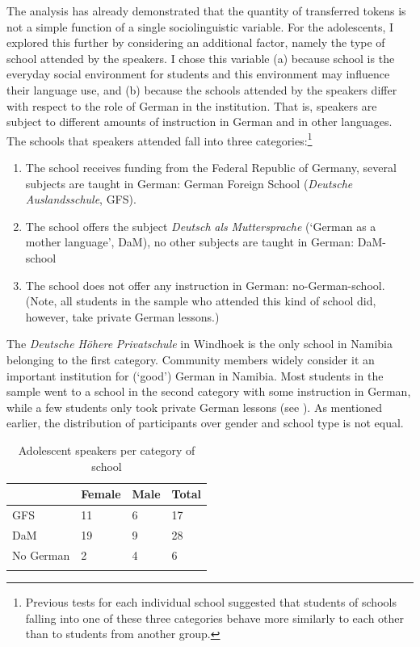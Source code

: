 \documentclass[output=paper]{langsci/langscibook}
\begin{document}
The analysis has already demonstrated that the quantity of transferred tokens is not a simple function of a single sociolinguistic variable.  For the adolescents, I explored this further by considering an additional factor, namely the type of school attended by the speakers. I chose this variable (a) because school is the everyday social environment for students and this environment may influence their language use, and (b) because the schools attended by the speakers differ with respect to the role of German in the institution. That is, speakers are subject to different amounts of instruction in German and in other languages. The schools that speakers attended fall into three categories:\footnote{Previous tests for each individual school suggested that students of schools falling into one of these three categories behave more similarly to each other than to students from another group.}

  
\begin{enumerate}   
	\item The school receives funding from the Federal Republic of Germany, several subjects are taught in German: German Foreign School (\textit{Deutsche} \textit{Auslandsschule}, GFS).
  	
	\item The school offers the subject \textit{Deutsch} \textit{als} \textit{Muttersprache} (‘German as a mother language’, DaM), no other subjects are taught in German: DaM-school
    
	\item The school does not offer any instruction in German: no-German-school. (Note, all students in the sample who attended this kind of school did, however, take private German lessons.)
 \end{enumerate}

The \textit{Deutsche} \textit{Höhere} \textit{Privatschule} in Windhoek is the only school in Namibia belonging to the first category. Community members widely consider it an important institution for (‘good’) German in Namibia. Most students in the sample went to a school in the second category with some instruction in German, while a few students only took private German lessons (see ). As mentioned earlier, the distribution of participants over gender and school type is not equal.

  

  
\begin{table}  
\begin{tabularx}{0.65\textwidth}{p{2cm}YYY}
\lsptoprule
 & {Female} & {Male} & {Total}\\
\hline
{GFS} & {11} & {6} & {17}\\
{DaM} & {19} & {9} & {28}\\
{No German} & {2} & {4} & {6}\\
\lspbottomrule
\end{tabularx}
\caption{Adolescent speakers per category of school}
\label{tab:bracke:6}
\end{table}
\end{document}
